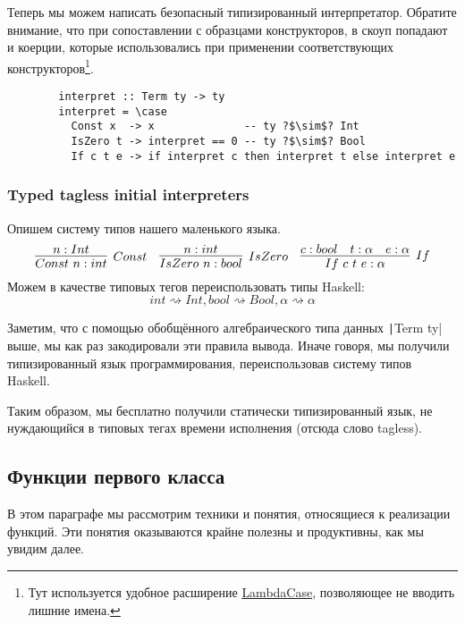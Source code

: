 \documentclass[12pt]{article}
\begin{document}
    Теперь мы можем написать безопасный типизированный интерпретатор.
    Обратите внимание, что при сопоставлении с образцами конструкторов, в скоуп попадают и коерции, которые использовались при применении соответствующих конструкторов\footnote{Тут используется удобное расширение \href{https://downloads.haskell.org/~ghc/9.0.1/docs/html/users_guide/exts/lambda_case.html}{LambdaCase}, позволяющее не вводить лишние имена.}.
    \begin{verbatim}
        interpret :: Term ty -> ty
        interpret = \case
          Const x  -> x              -- ty ?$\sim$? Int
          IsZero t -> interpret == 0 -- ty ?$\sim$? Bool
          If c t e -> if interpret c then interpret t else interpret e
    \end{verbatim}

    \subsubsection{Typed tagless initial interpreters}

    Опишем систему типов нашего маленького языка.
    \begin{equation*}{}
        \infer[Const]{Const~n : int}{n : Int}
        \quad
        \infer[IsZero]{IsZero~n : bool}{n : int}
        \quad
        \infer[If]{If~c~t~e : \alpha}{c : bool & t : \alpha & e : \alpha}
    \end{equation*}
    Можем в качестве типовых тегов переиспользовать типы Haskell: \[int \rightsquigarrow Int, bool \rightsquigarrow Bool, \alpha \rightsquigarrow \alpha\]

    Заметим, что с помощью обобщённого алгебраического типа данных \texttt|Term ty| выше, мы как раз закодировали эти правила вывода.
    Иначе говоря, мы получили типизированный язык программирования, переиспользовав систему типов Haskell.

    Таким образом, мы бесплатно получили статически типизированный язык, не нуждающийся в типовых тегах времени исполнения (отсюда слово tagless).

    \subsection{Функции первого класса} \label{subsec:functions}

    В этом параграфе мы рассмотрим техники и понятия, относящиеся к реализации функций.
    Эти понятия оказываются крайне полезны и продуктивны, как мы увидим далее.
\end{document}
